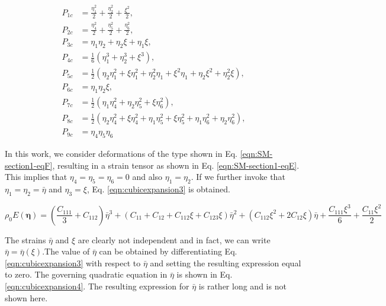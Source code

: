 \documentclass[showpacs,aps,floatfix,prb,reprint,superscriptaddress,onecolumn]{revtex4-1}
\begin{document}
\begin{subequations}
\label{eqn:expansioncubic2detailed} 
\begin{align}
        P_{1c} &=\frac{\eta_{1}^2}{2}  + \frac{\eta_{2}^2}{2} + \frac{\xi^2}{2} ,\\
        P_{2c} &=\frac{\eta_{4}^2}{2} + \frac{\eta_{5}^2}{2} + \frac{\eta_{6}^2}{2} ,\\
				P_{3c} &=\eta_{1}\eta_{2} + \eta_{2}\xi + \eta_{1}\xi,\\
				P_{4c} &=\frac{1}{6} \left(\eta_{1}^{3}+\eta_{2}^{3}+\xi^{3} \right) ,\\
				P_{5c} &=\frac{1}{2} \left(\eta_{2}\eta_{1}^{2} + \xi\eta_{1}^{2} + \eta_{2}^{2}\eta_{1} + \xi^{2}\eta_{1} + \eta_{2}\xi^{2} + \eta_{2}^{2}\xi \right)  ,\\
				P_{6c} &=\eta_{1}\eta_{2}\xi  ,\\
				P_{7c} &=\frac{1}{2} \left(\eta_{1}\eta_{4}^2 + \eta_{2}\eta_{5}^{2} + \xi\eta_{6}^{2}\right)  ,\\
				P_{8c} &=\frac{1}{2} \left(\eta_{2}\eta_{4}^2 + \xi\eta_{4}^{2} + \eta_{1}\eta_{5}^{2} + \xi\eta_{5}^{2}  + \eta_{1}\eta_{6}^{2}  +  \eta_{2}\eta_{6}^{2} \right) ,\\
				P_{9c} &=\eta_{4}\eta_{5}\eta_{6}  
\end{align}
\end{subequations}

In this work, we consider deformations of the type shown in Eq. \ref{eqn:SM-section1-eqF}, resulting in a strain tensor as shown in Eq. \ref{eqn:SM-section1-eqE}. This implies that $\eta_{4} = \eta_{5} = \eta_{6} = 0$ and also $\eta_{1} = \eta_{2}$. If we further invoke that $\eta_{1} = \eta_{2} = \bar{\eta}$ and $\eta_{3} = \xi$, Eq. \ref{eqn:cubicexpansion3} is obtained. 

\begin{equation}
\label{eqn:cubicexpansion3} 
\rho_{0} E \left(\bm{\eta}\right) = \left(\frac{C_{111}}{3} + C_{112}\right) \bar{\eta}^{3} + 
\left(C_{11} + C_{12} + C_{112} \xi + C_{123} \xi \right) \bar{\eta}^{2} + 
\left(C_{112} \xi^{2} + 2 C_{12} \xi \right) \bar{\eta} + 
\frac{C_{111} \xi^{3}}{6} + \frac{C_{11} \xi^{2}}{2}
\end{equation}

The strains $\bar{\eta}$ and $\xi$ are clearly not independent and in fact, we can write $\bar{\eta} = \bar{\eta} \left(\xi\right)$.The value of $\bar{\eta}$ can be obtained by differentiating Eq. \ref{eqn:cubicexpansion3} with respect to $\bar{\eta}$ and setting the resulting expression equal to zero. The governing quadratic equation in $\bar{\eta}$ is shown in Eq. \ref{eqn:cubicexpansion4}. The resulting expression for $\bar{\eta}$ is rather long and is not shown here. 
\end{document}
